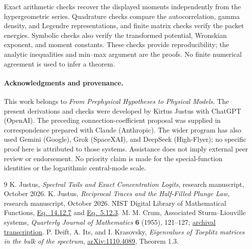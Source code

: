 \documentclass[10pt]{article}
\begin{document}
Exact arithmetic checks recover the displayed moments independently
from the hypergeometric series. Quadrature checks compare the
autocorrelation, gamma density, and Legendre representations, and
finite matrix checks verify the packet energies. Symbolic checks also verify
the transformed potential, Wronskian exponent, and moment constants. These checks provide
reproducibility; the analytic inequalities and min--max argument are
the proofs. No finite numerical agreement is used to infer a theorem.

\paragraph{Acknowledgments and provenance.}
This work belongs to \emph{From Prephysical Hypotheses to Physical Models}.
The present derivations and checks were developed by Kirtus Justus with
ChatGPT (OpenAI). The preceding connection-coefficient proposal was supplied
in correspondence prepared with Claude (Anthropic). The wider program has
also used Gemini (Google), Grok (SpaceXAI), and DeepSeek (High-Flyer); no
specific proof here is attributed to those systems. Assistance does not
imply external peer review or endorsement. No priority claim is made for
the special-function identities or the logarithmic central-mode scale.

\begin{thebibliography}{9}
 K. Justus, \emph{Spectral Tails and Exact Concentration Logits},
research manuscript, October 2026.
 K. Justus, \emph{Reciprocal Traces and the Half-Filled Plunge Law},
research manuscript, October 2026.
 NIST Digital Library of Mathematical Functions,
\href{https://dlmf.nist.gov/14.12.E7}{Eq.~14.12.7} and
\href{https://dlmf.nist.gov/5.12.E3}{Eq.~5.12.3}.
 M. M. Crum, Associated Sturm--Liouville systems,
\emph{Quarterly Journal of Mathematics} \textbf{6} (1955), 121--127;
\href{https://arxiv.org/abs/physics/9908019}{archival transcription}.
 P. Deift, A. Its, and I. Krasovsky,
\emph{Eigenvalues of Toeplitz matrices in the bulk of the spectrum},
\href{https://arxiv.org/abs/1110.4089}{arXiv:1110.4089}, Theorem 1.3.
\end{thebibliography}
\end{document}
